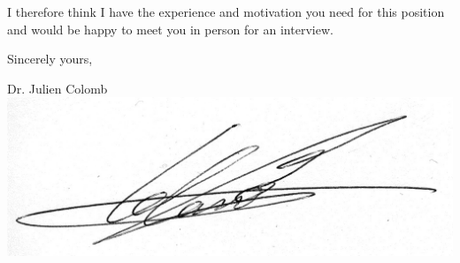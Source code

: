 I therefore think I have the experience and motivation you need for this position and would be happy to meet you in person for an interview.



 
Sincerely yours,\\

\hspace*{0.5\linewidth}
\begin{minipage}{0.3\linewidth}

Dr. Julien Colomb\\
\includegraphics[height=2\baselineskip]{Figures/signature.jpg}
\end{minipage}





